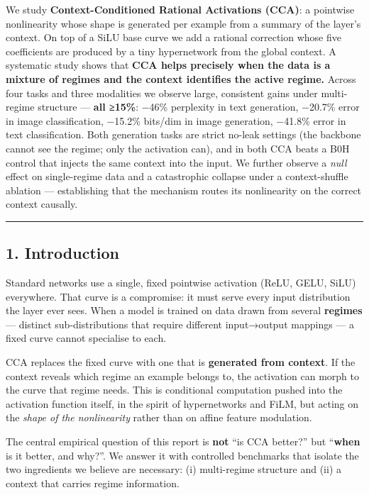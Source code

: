 \documentclass[
  11pt,
]{article}
\begin{document}
We study \textbf{Context-Conditioned Rational Activations (CCA)}: a
pointwise nonlinearity whose shape is generated per example from a
summary of the layer's context. On top of a SiLU base curve we add a
rational correction whose five coefficients are produced by a tiny
hypernetwork from the global context. A systematic study shows that
\textbf{CCA helps precisely when the data is a mixture of regimes and
the context identifies the active regime.} Across four tasks and three
modalities we observe large, consistent gains under multi-regime
structure --- \textbf{all ≥15\%}: −46\% perplexity in text generation,
−20.7\% error in image classification, −15.2\% bits/dim in image
generation, −41.8\% error in text classification. Both generation tasks
are strict no-leak settings (the backbone cannot see the regime; only
the activation can), and in both CCA beats a B0H control that injects
the same context into the input. We further observe a \emph{null} effect
on single-regime data and a catastrophic collapse under a
context-shuffle ablation --- establishing that the mechanism routes its
nonlinearity on the correct context causally.

\begin{center}\rule{0.5\linewidth}{0.5pt}\end{center}

\subsection{1. Introduction}\label{introduction}

Standard networks use a single, fixed pointwise activation (ReLU, GELU,
SiLU) everywhere. That curve is a compromise: it must serve every input
distribution the layer ever sees. When a model is trained on data drawn
from several \textbf{regimes} --- distinct sub-distributions that
require different input→output mappings --- a fixed curve cannot
specialise to each.

CCA replaces the fixed curve with one that is \textbf{generated from
context}. If the context reveals which regime an example belongs to, the
activation can morph to the curve that regime needs. This is conditional
computation pushed into the activation function itself, in the spirit of
hypernetworks and FiLM, but acting on the \emph{shape of the
nonlinearity} rather than on affine feature modulation.

The central empirical question of this report is \textbf{not} ``is CCA
better?'' but ``\textbf{when} is it better, and why?''. We answer it
with controlled benchmarks that isolate the two ingredients we believe
are necessary: (i) multi-regime structure and (ii) a context that
carries regime information.
\end{document}
